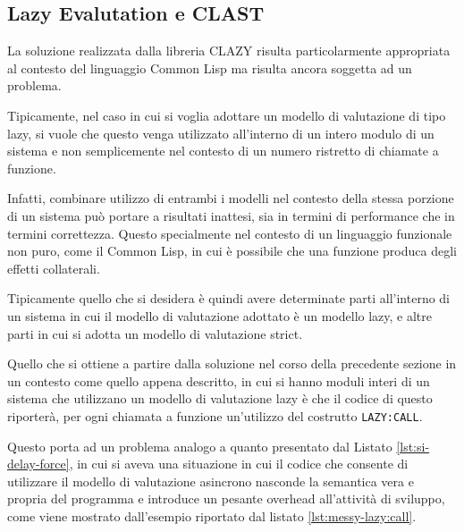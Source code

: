 \subsection{Lazy Evalutation e CLAST}

La soluzione realizzata dalla libreria CLAZY risulta particolarmente appropriata al contesto del linguaggio Common Lisp ma risulta ancora soggetta ad un problema.

Tipicamente, nel caso in cui si voglia adottare un modello di valutazione di tipo lazy, si vuole che questo venga utilizzato all'interno di un intero modulo di un sistema e non semplicemente nel contesto di un numero ristretto di chiamate a funzione.

Infatti, combinare utilizzo di entrambi i modelli nel contesto della stessa porzione di un sistema può portare a risultati inattesi, sia in termini di performance che in termini correttezza. Questo specialmente nel contesto di un linguaggio funzionale non puro, come il Common Lisp, in cui è possibile che una funzione produca degli effetti collaterali.

Tipicamente quello che si desidera è quindi avere determinate parti all'interno di un sistema in cui il modello di valutazione adottato è un modello lazy, e altre parti in cui si adotta un modello di valutazione strict.

Quello che si ottiene a partire dalla soluzione nel corso della precedente sezione in un contesto come quello appena descritto, in cui si hanno moduli interi di un sistema che utilizzano un modello di valutazione lazy è che il codice di questo riporterà, per ogni chiamata a funzione un'utilizzo del costrutto \texttt{LAZY:CALL}.

Questo porta ad un problema analogo a quanto presentato dal Listato \ref{lst:si-delay-force}, in cui si aveva una situazione in cui il codice che consente di utilizzare il modello di valutazione asincrono nasconde la semantica vera e propria del programma e introduce un pesante overhead all'attività di sviluppo, come viene mostrato dall'esempio riportato dal listato \ref{lst:messy-lazy:call}.

